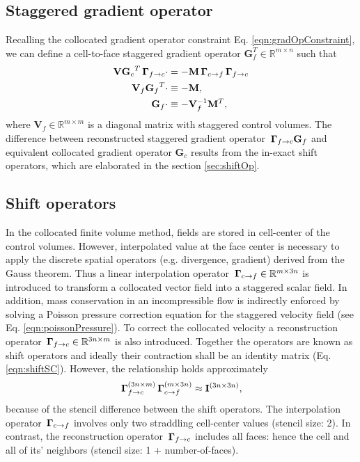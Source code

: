 \subsection{Staggered gradient operator}

Recalling the collocated gradient operator constraint Eq. \eqref{eqn:gradOpConstraint}, we can define a cell-to-face staggered gradient operator $\mathbf{G}_f^T \in \mathbb{R}^{m \times n}$ such that 
\begin{align}
\begin{split}
\mathbf{V} {\mathbf{G}_c}^T \, \mathbf{\Gamma}_{f \rightarrow c} \cdot & = - \mathbf{M} \, \mathbf{\Gamma}_{c \rightarrow f} \, \mathbf{\Gamma}_{f \rightarrow c} 
\\
\mathbf{V}_f {\mathbf{G}_f}^T \cdot & \equiv - \mathbf{M},
\\
{\mathbf{G}_f} \cdot & \equiv -\mathbf{V}_f^{-1} \mathbf{M}^T,
\end{split}
\label{eqn:gradStaggOp}
\end{align}
where $\mathbf{V}_f \in \mathbb{R}^{m \times m} $ is a diagonal matrix with staggered control volumes. The difference between reconstructed staggered gradient operator $\, \mathbf{\Gamma}_{f \rightarrow c} \mathbf{G}_f$ and equivalent collocated gradient operator $ \mathbf{G}_c $ results from the in-exact shift operators, which are elaborated in the section \eqref{sec:shiftOp}.




\subsection{Shift operators}
\label{sec:shiftOp}

In the collocated finite volume method, fields are stored in cell-center of the control volumes. However, interpolated value at the face center is necessary to apply the discrete spatial operators (e.g. divergence, gradient) derived from the Gauss theorem. Thus a linear interpolation operator $\, \mathbf{\Gamma}_{c \rightarrow f} \in \mathbb{R}^{m \times 3n} $ is introduced to transform a collocated vector field into a staggered scalar field. In addition, mass conservation in an incompressible flow is indirectly enforced by solving a Poisson pressure correction equation for the staggered velocity field (see Eq. \eqref{eqn:poissonPressure}). To correct the collocated velocity a reconstruction operator $\, \mathbf{\Gamma}_{f \rightarrow c} \in \mathbb{R}^{3n \times m} $ is also introduced. Together the operators are known as shift operators and ideally their contraction shall be an identity matrix (Eq. \eqref{eqn:shiftSC}). However, the relationship holds approximately
\begin{equation}
\, \mathbf{\Gamma}_{f \rightarrow c}^{(3n \times m)} \, \mathbf{\Gamma}_{c \rightarrow f}^{(m \times 3n)} \approx \mathbf{I}^{(3n \times 3n)},
\label{eqn:shiftOperators}
\end{equation}
because of the stencil difference between the shift operators. The interpolation operator $\, \mathbf{\Gamma}_{c \rightarrow f}$ involves only two straddling cell-center values (stencil size: 2). In contrast, the reconstruction operator $\, \mathbf{\Gamma}_{f \rightarrow c}$ includes all faces: hence the cell and all of its' neighbors (stencil size: 1 + number-of-faces).

